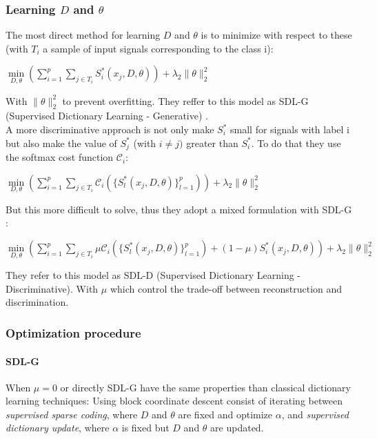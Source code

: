 \subsubsection{Learning $D$ and $\theta$}
The most direct method for learning $D$ and $\theta$ is to minimize with respect to these (with $T_i$ a sample of input signals corresponding to the class i):
\begin{center}
 $\underset{D,\theta}{\min}(\sum_{i=1}^p \sum_{j \in T_i}S^*_i(x_j,D,\theta))+ \lambda_2 \|\theta\|^2_2$
\end{center}
With  $ \|\theta\|^2_2$ to prevent overfitting. They reffer to this model as SDL-G (Supervised Dictionary Learning - Generative) \cite{mairal:inria-00322431}.\\
A more discriminative approach is not only make $S^*_i$ small for signals with label i but also make the value of $S^*_j$ (with $i \neq j)$ greater than $S^*_i$. To do that they use the softmax cost function $\mathcal{C}_i$:
\begin{center}
  $\underset{D,\theta}{\min}(\sum_{i=1}^p \sum_{j \in T_i} \mathcal{C}_i(\{ S^*_l(x_j,D,\theta)\}^{p}_{l=1}))+ \lambda_2 \|\theta\|^2_2$
\end{center}
But this more difficult to solve, thus they adopt a mixed formulation with SDL-G :
\begin{center}
   $\underset{D,\theta}{\min}(\sum_{i=1}^p \sum_{j \in T_i} \mu \mathcal{C}_i(\{ S^*_l(x_j,D,\theta)\}^{p}_{l=1}) + (1-\mu)S^*_i(x_j,D,\theta))+ \lambda_2 \|\theta\|^2_2$
\end{center}
They refer to this model as SDL-D (Supervised Dictionary Learning - Discriminative). With $\mu$ which control the trade-off between reconstruction and discrimination.

\subsubsection{Optimization  procedure}
\paragraph{SDL-G}
When $\mu = 0$ or directly SDL-G have the same properties than classical dictionary learning techniques: Using block coordinate descent  consist of iterating between \textit{supervised sparse coding}, where $D$ and $\theta$ are fixed and optimize $\alpha$, and \textit{supervised dictionary update}, where  $\alpha$ is fixed but $D$ and $\theta$ are updated.
